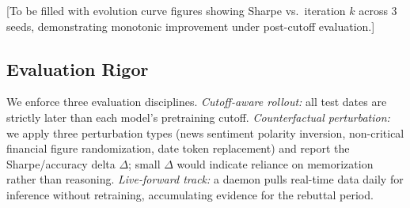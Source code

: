 [To be filled with evolution curve figures showing Sharpe vs.\ iteration $k$ across 3 seeds, demonstrating monotonic improvement under post-cutoff evaluation.]

\subsection{Evaluation Rigor}

We enforce three evaluation disciplines. \emph{Cutoff-aware rollout:} all test dates are strictly later than each model's pretraining cutoff. \emph{Counterfactual perturbation:} we apply three perturbation types (news sentiment polarity inversion, non-critical financial figure randomization, date token replacement) and report the Sharpe/accuracy delta $\Delta$; small $\Delta$ would indicate reliance on memorization rather than reasoning. \emph{Live-forward track:} a daemon pulls real-time data daily for inference without retraining, accumulating evidence for the rebuttal period.
